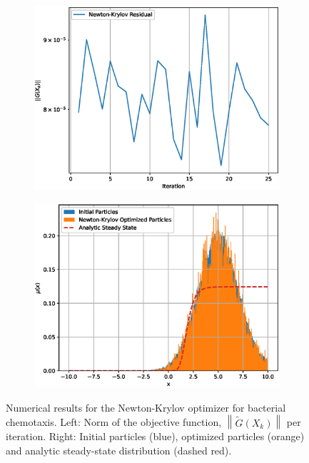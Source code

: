 \documentclass{article}
\newcommand{\norm}[1]{\left\lVert#1\right\rVert}
\begin{document}
\begin{figure}[h]
    \centering
    \begin{subfigure}[b]{0.51\textwidth}
        \centering
        \includegraphics[width=\textwidth]{figures/NK_Chemotaxis_Loss.eps}
    \end{subfigure}%
    \begin{subfigure}[b]{0.51\textwidth}
        \centering
        \includegraphics[width=\textwidth]{figures/NK_Chemotaxis_particles.eps}
    \end{subfigure}
    \caption{Numerical results for the Newton-Krylov optimizer for bacterial chemotaxis. Left: Norm of the objective function, $\norm{\tilde{G}(X_k)}$ per iteration. Right: Initial particles (blue), optimized particles (orange) and analytic steady-state distribution (dashed red).}
    \label{fig:nk_particles_chemotaxis}
\end{figure}
\end{document}
